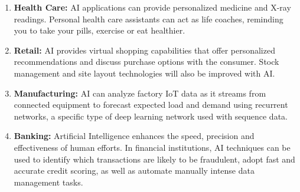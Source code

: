 \documentclass[a4paper, 12pt]{article}
\begin{document}
\begin{enumerate}
\item \textbf{Health Care:} AI applications can provide personalized medicine and X-ray readings. Personal health care assistants can act as life coaches, reminding you to take your pills, exercise or eat healthier.
\item \textbf{Retail:} AI provides virtual shopping capabilities that offer personalized recommendations and discuss purchase options with the consumer. Stock management and site layout technologies will also be improved with AI.
\item \textbf{Manufacturing:} AI can analyze factory IoT data as it streams from connected equipment to forecast expected load and demand using recurrent networks, a specific type of deep learning network used with sequence data.
\item \textbf{Banking:} Artificial Intelligence enhances the speed, precision and effectiveness of human efforts. In financial institutions, AI techniques can be used to identify which transactions are likely to be fraudulent, adopt fast and accurate credit scoring, as well as automate manually intense data management tasks.
\end{enumerate}
\end{document}
